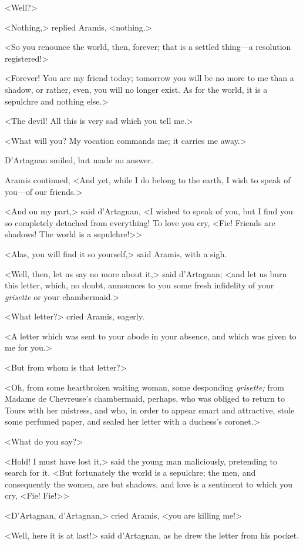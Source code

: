 <Well?> 

<Nothing,> replied Aramis, <nothing.> 

<So you renounce the world, then, forever; that is a settled thing---a resolution registered!> 

<Forever! You are my friend today; tomorrow you will be no more to me than a shadow, or rather, even, you will no longer exist. As for the world, it is a sepulchre and nothing else.> 

<The devil! All this is very sad which you tell me.> 

<What will you? My vocation commands me; it carries me away.> 

D'Artagnan smiled, but made no answer. 

Aramis continued, <And yet, while I do belong to the earth, I wish to speak of you---of our friends.> 

<And on my part,> said d'Artagnan, <I wished to speak of you, but I find you so completely detached from everything! To love you cry, <Fie! Friends are shadows! The world is a sepulchre!>> 

<Alas, you will find it so yourself,> said Aramis, with a sigh. 

<Well, then, let us say no more about it,> said d'Artagnan; <and let us burn this letter, which, no doubt, announces to you some fresh infidelity of your \textit{grisette} or your chambermaid.> 

<What letter?> cried Aramis, eagerly. 

<A letter which was sent to your abode in your absence, and which was given to me for you.> 

<But from whom is that letter?> 

<Oh, from some heartbroken waiting woman, some desponding \textit{grisette;} from Madame de Chevreuse's chambermaid, perhaps, who was obliged to return to Tours with her mistress, and who, in order to appear smart and attractive, stole some perfumed paper, and sealed her letter with a duchess's coronet.> 

<What do you say?> 

<Hold! I must have lost it,> said the young man maliciously, pretending to search for it. <But fortunately the world is a sepulchre; the men, and consequently the women, are but shadows, and love is a sentiment to which you cry, <Fie! Fie!>> 

<D'Artagnan, d'Artagnan,> cried Aramis, <you are killing me!> 

<Well, here it is at last!> said d'Artagnan, as he drew the letter from his pocket. 

